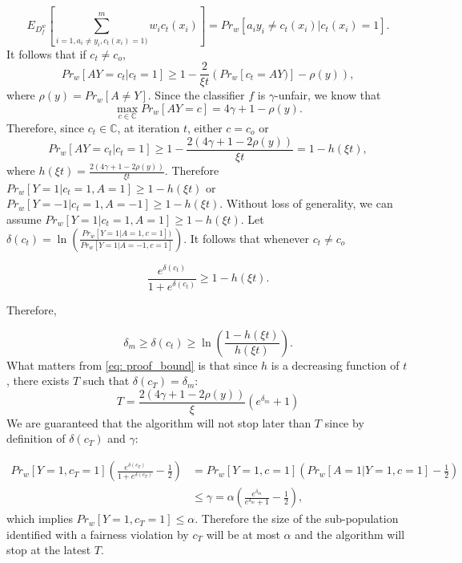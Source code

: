 \documentclass{article}
\begin{document}
\begin{equation}
E_{D_{f}^{w}}\left[\displaystyle\sum_{i=1, a_{i}\neq y_{i}, c_{t}(x_{i})=1) }^{m} w_{i}c_{t}(x_{i})\right] = Pr_{w}[a_{i}y_{i}\neq c_{t}(x_{i})| c_{t}(x_{i})=1].
\end{equation}
It follows that if $c_{t}\neq c_{o}$, 
\begin{equation}
Pr_{w}[AY=c_{t}|c_{t}=1] \geq 1 - \frac{2}{\xi t}\left(Pr_{w}[c_{t}=AY)] - \rho(y)\right),
\end{equation}
where $\rho(y) = Pr_{w}[A\neq Y]$. 
Since the classifier $f$ is $\gamma$-unfair, we know that 
\begin{equation}
\max_{c\in\mathbb{C}}Pr_{w}[AY=c] = 4\gamma + 1 - \rho(y). 
\end{equation} 
Therefore, since $c_{t}\in \mathbb{C}$, at iteration $t$, either $c=c_{o}$ or
\begin{equation}
\label{eq: bound}
Pr_{w}[AY=c_{t}|c_{t}=1] \geq 1 - \frac{2(4\gamma + 1 - 2\rho(y))}{\xi t}= 1-h(\xi t),
\end{equation}
where $h(\xi t) = \frac{2(4\gamma + 1 - 2\rho(y))}{\xi t}$.
Therefore $Pr_{w}[Y=1|c_{t}=1, A=1] \geq 1-h(\xi t)$ or $Pr_{w}[Y=-1|c_{t}=1, A=-1] \geq 1-h(\xi t)$. Without loss of generality, we can assume $Pr_{w}[Y=1|c_{t}=1, A=1] \geq 1-h(\xi t)$. Let $\delta(c_{t}) = \ln\left(\frac{Pr_{w}[Y=1|A=1, c=1])}{Pr_{w}[Y=1|A=-1, c=1]}\right)$. It follows that whenever $c_{t}\neq c_{o}$

\begin{equation}
\frac{e^{\delta(c_{t})}}{1 + e^{\delta(c_{t})}} \geq 1 -h(\xi t).
\end{equation}

Therefore,

\begin{equation}
\label{eq: proof_bound}
\delta_{m}\geq\delta(c_{t})\geq \ln\left(\frac{1-h(\xi t)}{h(\xi t)}\right).
\end{equation}
What matters from \eqref{eq: proof_bound} is that since $h$ is a decreasing function of $t$, there exists $T$ such that $\delta(c_{T}) = \delta_{m}$:
\begin{equation}
T = \frac{2(4\gamma + 1-2\rho(y))}{\xi} \left(e^{\delta_{m}} + 1\right)
\end{equation}
We are guaranteed that the algorithm will not stop later than $T$ since by definition of $\delta(c_{T})$ and $\gamma$:

\begin{equation}
\begin{split}
Pr_{w}[Y=1,c_{T}=1]\left(\frac{e^{\delta(c_{T})}}{1 + e^{\delta(c_{T})}}-\frac{1}{2}\right)&=Pr_{w}[Y=1,c=1]\left(Pr_{w}[A=1| Y=1, c=1] - \frac{1}{2}\right)\\
& \leq \gamma = \alpha\left(\frac{e^{\delta_{m}}}{e^{\delta_{m}}+ 1}- \frac{1}{2}\right),
\end{split}
\end{equation}
which implies $Pr_{w}[Y=1,c_{T}=1]\leq \alpha$. Therefore the size of the sub-population identified with a fairness violation by $c_{T}$ will be at most $\alpha$ and the algorithm will stop at the latest $T$. 
\end{document}

